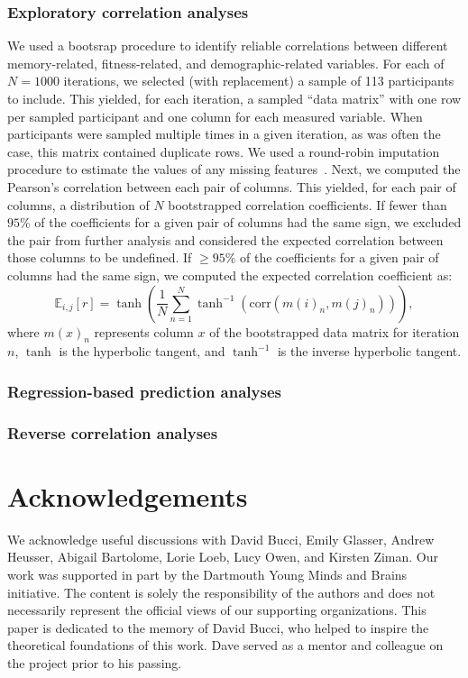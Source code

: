 \documentclass[10pt]{article}
\begin{document}
\subsubsection*{Exploratory correlation analyses}
We used a bootsrap procedure to identify reliable correlations between
different memory-related, fitness-related, and demographic-related
variables.  For each of $N = 1000$ iterations, we selected (with
replacement) a sample of 113 participants to include.  This yielded,
for each iteration, a sampled ``data matrix'' with one row per sampled
participant and one column for each measured variable.  When
participants were sampled multiple times in a given iteration, as was
often the case, this matrix contained duplicate rows.  We used a
round-robin imputation procedure to estimate the values of any missing
features~\citep{Buck60}.  Next, we computed the Pearson's correlation
between each pair of columns.  This yielded, for each pair of columns,
a distribution of $N$ bootstrapped correlation coefficients.  If fewer
than $95\%$ of the coefficients for a given pair of columns had the
same sign, we excluded the pair from further analysis and considered
the expected correlation between those columns to be undefined.  If
$\geq 95\%$ of the coefficients for a given pair of columns had the
same sign, we computed the expected correlation coefficient as:
\[
  \mathbb{E}_{i, j}\left[ r\right] = \tanh\left(\frac{1}{N} \sum_{n=1}^N
  \tanh^{-1}(\mathrm{corr}\left(m(i)_n, m(j)_n\right))\right),
\]
where $m(x)_n$ represents column $x$ of the bootstrapped data matrix
for iteration $n$, $\tanh$ is the hyperbolic tangent, and $\tanh^{-1}$
is the inverse hyperbolic tangent.

\subsubsection*{Regression-based prediction analyses}

\subsubsection*{Reverse correlation analyses}




\section*{Acknowledgements}
We acknowledge useful discussions with David Bucci, Emily Glasser, Andrew Heusser, Abigail Bartolome, Lorie Loeb, Lucy Owen, and Kirsten Ziman.  Our work was supported in part by the Dartmouth Young Minds and Brains initiative.  The content is solely the responsibility of the authors and does not necessarily represent the official views of our supporting organizations.  This paper is dedicated to the memory of David Bucci, who helped to inspire the theoretical foundations of this work.  Dave served as a mentor and colleague on the project prior to his passing.
\end{document}
